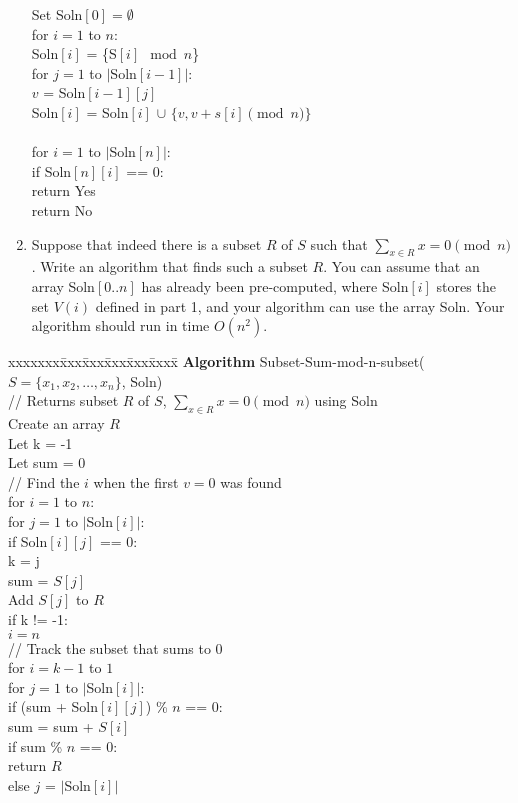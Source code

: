 \documentclass[11pt]{article}
\def\question#1{\red{#1}}
\def\soln#1{\par\blu{#1}} %
\def\blu#1{{\color{blu}#1}}
\def\red#1{{\color{red}#1}}
\begin{document}
\begin{enumerate}
{\begin{tabbing}
\>\> Set Soln$[0] = \emptyset$ \\
\>\> for $i = 1$ to $n$: \\
\>\>\> Soln$[i]$ = \{S$[i] \mod n$\} \\
\>\>\> for $j = 1$ to $|$Soln$[i-1]|$: \\
\>\>\>\> $v$ = Soln$[i-1][j]$ \\
\>\>\>\> Soln$[i]$ = Soln$[i]$ $\cup$ $\{v, v+s[i] \pmod n\}$ \\ \\
\>\> for $i = 1$ to $|$Soln$[n]|$: \\
\>\>\> if Soln$[n][i]$ == 0: \\
\>\>\>\> return Yes \\
\>\> return No \\
\end{tabbing}
}
\item Suppose that indeed there is a subset $R$ of $S$ such that $\sum_{x
   \in R} x = 0 \pmod n$.  \question{Write an algorithm that finds such a subset
$R$}.  You can assume that an array Soln$[0..n]$ has already been
pre-computed, where Soln$[i]$ stores the set $V(i)$ defined in part 1,
and your algorithm can use the array Soln. Your algorithm should
run in time $O(n^2)$.
\end{enumerate}
\soln{
\begin{tabbing}
xxxxxxx\=xxx\=xxx\=xxx\=xxx\=xxxx\= \kill
\> {\bf Algorithm} Subset-Sum-mod-n-subset($S = \{x_1,x_2,\ldots,x_n\}$, Soln) \\
\>\> // Returns subset $R$ of $S$, $\sum_{x \in R} x = 0 \pmod n$ using Soln  \\
\>\> Create an array $R$ \\
\>\> Let k = -1 \\
\>\> Let sum = 0 \\
\>\> // Find the $i$ when the first $v = 0$ was found \\
\>\> for $i = 1$ to $n$: \\
\>\>\> for $j = 1$ to $|$Soln$[i]|$: \\
\>\>\>\> if Soln$[i][j]$ == 0: \\
\>\>\>\>\> k = j \\
\>\>\>\>\> sum = $S[j]$ \\
\>\>\>\>\> Add $S[j]$ to $R$ \\
\>\>\> if k != -1: \\
\>\>\>\> $i = n$ \\
\>\> // Track the subset that sums to 0 \\
\>\> for $i = k - 1$ to $1$ \\
\>\>\> for $j = 1$ to $|$Soln$[i]|$: \\
\>\>\>\> if (sum + Soln$[i][j]$) \% $n$ == 0: \\
\>\>\>\>\> sum = sum + $S[i]$ \\
\>\>\>\>\> if sum \% $n$ == 0: \\
\>\>\>\>\>\> return $R$ \\
\>\>\>\>\> else $j$ = $|$Soln$[i]|$ \\
\end{tabbing}
}
\end{document}
